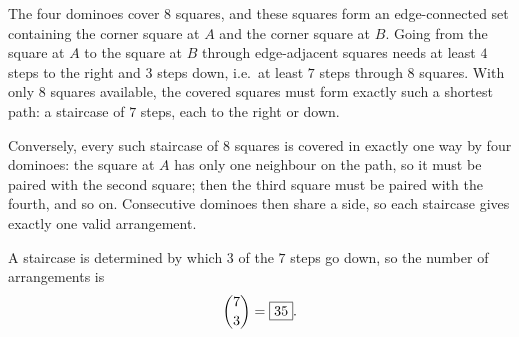 The four dominoes cover $8$ squares, and these squares form an edge-connected set containing the corner square at $A$ and the corner square at $B$. Going from the square at $A$ to the square at $B$ through edge-adjacent squares needs at least $4$ steps to the right and $3$ steps down, i.e.\ at least $7$ steps through $8$ squares. With only $8$ squares available, the covered squares must form exactly such a shortest path: a staircase of $7$ steps, each to the right or down.

Conversely, every such staircase of $8$ squares is covered in exactly one way by four dominoes: the square at $A$ has only one neighbour on the path, so it must be paired with the second square; then the third square must be paired with the fourth, and so on. Consecutive dominoes then share a side, so each staircase gives exactly one valid arrangement.

A staircase is determined by which $3$ of the $7$ steps go down, so the number of arrangements is
\[
\dbinom73=\boxed{35}.
\]
